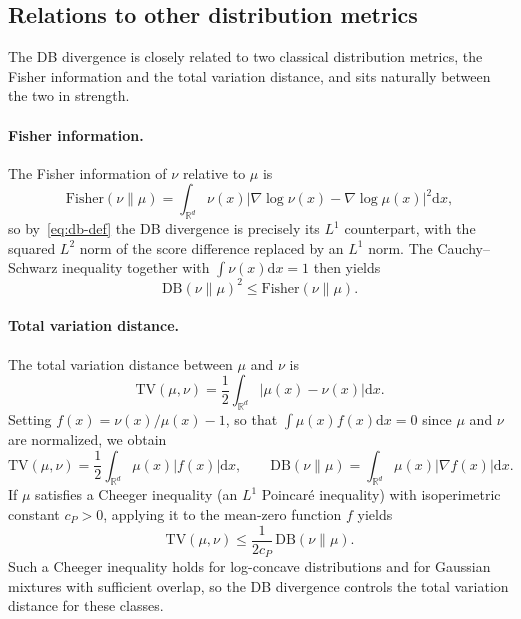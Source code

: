 \documentclass{article}
\newcommand{\Le}{\leqslant}
\newcommand{\D}{\mathrm{d}}
\newcommand{\DB}{\mathrm{DB}}
\newcommand{\TV}{\mathrm{TV}}
\newcommand{\Fish}{\mathrm{Fisher}}
\theoremstyle{plain}
\begin{document}
\subsection{Relations to other distribution metrics}

The DB divergence is closely related to two classical distribution metrics, the Fisher information and the total variation distance, and sits naturally between the two in strength.

\paragraph{Fisher information.}
The Fisher information of $\nu$ relative to $\mu$ is
\begin{equation*}
    \Fish(\nu \| \mu) = \int_{\mathbb R^d} \nu(x) \bigl|\nabla \log \nu(x) - \nabla \log \mu(x) \bigr|^2 \D x,
\end{equation*}
so by~\eqref{eq:db-def} the DB divergence is precisely its $L^1$ counterpart, with the squared $L^2$ norm of the score difference replaced by an $L^1$ norm. The Cauchy--Schwarz inequality together with $\int \nu(x) \D x = 1$ then yields
\begin{equation}\label{eq:db-fisher}
    \DB(\nu \| \mu)^2 \Le \Fish(\nu \| \mu).
\end{equation}

\paragraph{Total variation distance.}
The total variation distance between $\mu$ and $\nu$ is
\begin{equation*}
    \TV(\mu, \nu) = \frac{1}{2} \int_{\mathbb R^d} |\mu(x) - \nu(x)| \D x.
\end{equation*}
Setting $f(x) = \nu(x)/\mu(x) - 1$, so that $\int \mu(x) f(x) \D x = 0$ since $\mu$ and $\nu$ are normalized, we obtain
\begin{equation*}
    \TV(\mu, \nu) = \frac{1}{2} \int_{\mathbb R^d} \mu(x) |f(x)| \D x, \qquad \DB(\nu \| \mu) = \int_{\mathbb R^d} \mu(x) |\nabla f(x)| \D x.
\end{equation*}
If $\mu$ satisfies a Cheeger inequality (an $L^1$ Poincar\'{e} inequality) with isoperimetric constant $c_{P} > 0$, applying it to the mean-zero function $f$ yields
\begin{equation}\label{eq:tv-db}
    \TV(\mu, \nu) \Le \frac{1}{2c_{P}}\, \DB(\nu \| \mu).
\end{equation}
Such a Cheeger inequality holds for log-concave distributions and for Gaussian mixtures with sufficient overlap, so the DB divergence controls the total variation distance for these classes.
\end{document}
